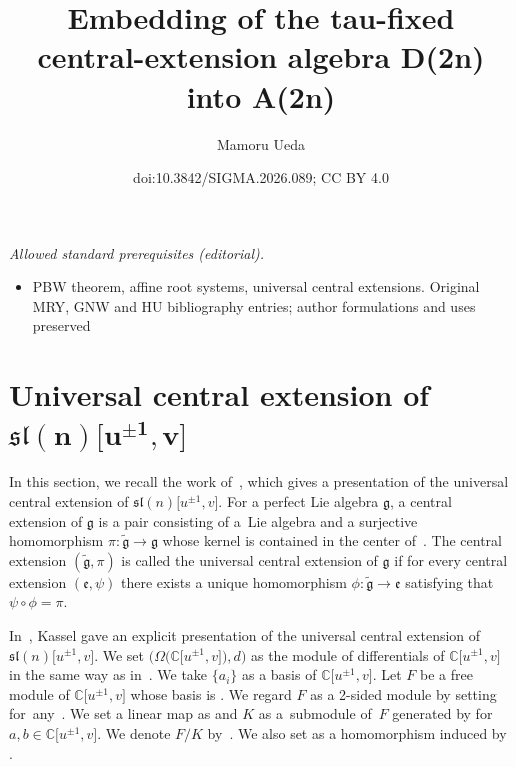 \documentclass[10pt,a4paper]{amsart}
\title{Embedding of the tau-fixed central-extension algebra D(2n) into A(2n)}
\author{Mamoru Ueda}
\date{doi:10.3842/SIGMA.2026.089; CC BY 4.0}
\numberwithin{equation}{section}
\theoremstyle{definition}
\begin{document}
\maketitle
\noindent\textit{Allowed standard prerequisites (editorial).}\begin{itemize}
\item PBW theorem, affine root systems, universal central extensions. Original MRY, GNW and HU bibliography entries; author formulations and uses preserved
\end{itemize}\medskip
\section[Universal central extension of sl(n){[u\^{}\{pm1\},v]}]{Universal central extension of $\boldsymbol{\mathfrak{sl}(n)\bigl[u^{\pm1},v\bigr]}$}
In this section, we recall the work of~\cite{MRY}, which gives a presentation of the universal central extension of $\mathfrak{sl}(n)\bigl[u^{\pm1},v\bigr]$. For a perfect Lie algebra $\mathfrak{g}$, a central extension of $\mathfrak{g}$ is a pair consisting of a~Lie algebra  and a surjective homomorphism $\pi\colon\widetilde{\mathfrak{g}}\to\mathfrak{g}$ whose kernel is contained in the center of~. The central extension $(\widetilde{\mathfrak{g}},\pi)$ is called the universal central extension of $\mathfrak{g}$ if for every central extension $(\mathfrak{e},\psi)$ there exists a unique homomorphism $\phi\colon\widetilde{\mathfrak{g}}\to\mathfrak{e}$ satisfying that $\psi\circ\phi=\pi$.

In~\cite{Kassel}, Kassel gave an explicit presentation of the universal central extension of $\mathfrak{sl}(n)\bigl[u^{\pm1},v\bigr]$.
We set $\bigl(\Omega\bigl(\mathbb{C}\bigl[u^{\pm1},v\bigr]\bigr),d\bigr)$ as the module of differentials of $\mathbb{C}\bigl[u^{\pm1},v\bigr]$ in the same way as in~\cite[Section~2]{MRY}. We take $\{a_i\}$ as a basis of $\mathbb{C}\bigl[u^{\pm1},v\bigr]$. Let $F$ be a free module of $\mathbb{C}\bigl[u^{\pm1},v\bigr]$ whose basis is . We regard $F$ as a 2-sided  module by setting  for~any~. We set a linear map  as  and $K$ as a~submodule of~$F$ generated by  for $a,b\in\mathbb{C}\bigl[u^{\pm1},v\bigr]$. We denote $F/K$ by~. We also set  as a homomorphism induced by .
\end{document}
